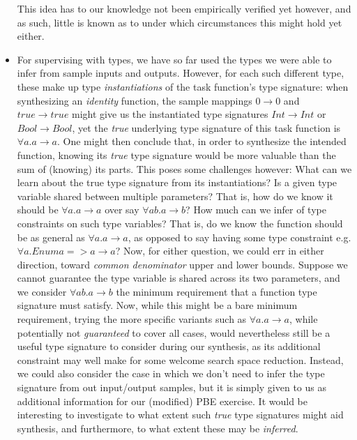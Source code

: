 \documentclass{article}
\begin{document}
\begin{itemize}
    This idea has to our knowledge not been empirically verified yet however,
    and as such, little is known as to under which circumstances this might hold yet either. 
    \item For supervising with types, we have so far used the types we were able to infer from sample inputs and outputs.
    However, for each such different type,
    these make up type \emph{instantiations} of the task function's type signature:
    when synthesizing an \emph{identity} function,
    the sample mappings $0 \rightarrow 0$ and $true \rightarrow true$
    might give us the instantiated type signatures
    $Int \rightarrow Int$ or $Bool \rightarrow Bool$,
    yet the \emph{true} underlying type signature of this task function is $\forall a . a \rightarrow a$.
    One might then conclude that, in order to synthesize the intended function,
    knowing its \emph{true} type signature would be more valuable than the sum of (knowing) its parts.
    This poses some challenges however:
    What can we learn about the true type signature from its instantiations?
    Is a given type variable shared between multiple parameters?
    That is, how do we know it should be $\forall a . a \rightarrow a$ over say $\forall a b . a \rightarrow b$?
    How much can we infer of type constraints on such type variables?
    That is, do we know the function should be as general as $\forall a . a \rightarrow a$, as opposed to say having some type constraint e.g. $\forall a . Enum a => a \rightarrow a$?
    Now, for either question, we could err in either direction, toward \emph{common denominator} upper and lower bounds.
    Suppose we cannot guarantee the type variable is shared across its two parameters,
    and we consider $\forall a b . a \rightarrow b$ the minimum requirement that a function type signature must satisfy.
    Now, while this might be a bare minimum requirement,
    trying the more specific variants such as $\forall a . a \rightarrow a$,
    while potentially not \emph{guaranteed} to cover all cases,
    would nevertheless still be a useful type signature to consider during our synthesis,
    as its additional constraint may well make for some welcome search space reduction.
    Instead, we could also consider the case in which we don't need to infer the type signature from out input/output samples,
    but it is simply given to us as additional information for our (modified) PBE exercise.
    It would be interesting to investigate to what extent such \emph{true} type signatures
    might aid synthesis, and furthermore, to what extent these may be \emph{inferred}.

\end{itemize}
\end{document}

